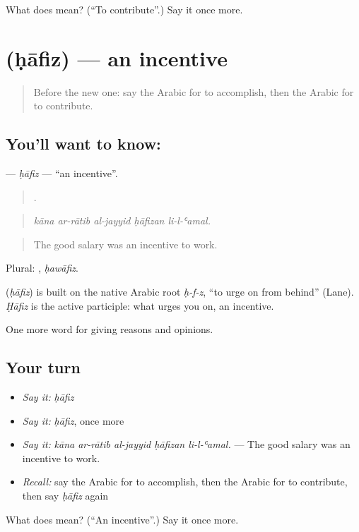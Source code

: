 \begin{tcolorbox}[breakable,colback=teal!4,colframe=teal!35!black,title={Before you move on}]
What does  mean? (\textquotedblleft{}To contribute\textquotedblright{}.) Say it once more.
\end{tcolorbox}
\section[\texorpdfstring{\ar{حافز} (ḥāfiz)}{حافز (ḥāfiz)}]{ (ḥāfiz) — an incentive}

\label{lesson:AR-C371-hafiz}



\begin{quote}
Before the new one: say the Arabic for to accomplish, then the Arabic for to contribute.
\end{quote}

\subsection*{You'll want to know: }
\textbf{} — \emph{ḥāfiz} — \textquotedblleft{}an incentive\textquotedblright{}.

\begin{quote}
    .
\end{quote}

\begin{quote}
\emph{kāna ar-rātib al-jayyid ḥāfizan li-l-ʿamal.}
\end{quote}

\begin{quote}
The good salary was an incentive to work.
\end{quote}

Plural: , \emph{ḥawāfiz}.

\begin{cousinweb}
\textbf{} (\emph{ḥāfiz}) is built on the native Arabic root \emph{ḥ-f-z}, \textquotedblleft{}to urge on from behind\textquotedblright{} (Lane). \emph{Ḥāfiz} is the active participle: what urges you on, an incentive.
\end{cousinweb}

\begin{grammarlens}[title={What you've built}]
One more word for giving reasons and opinions.
\end{grammarlens}

\subsection*{Your turn}
\begin{itemize}
\raggedright
  \item \emph{Say it:} \emph{ḥāfiz}
  \item \emph{Say it:} \emph{ḥāfiz}, once more
  \item \emph{Say it:} \emph{kāna ar-rātib al-jayyid ḥāfizan li-l-ʿamal.} — The good salary was an incentive to work.
  \item \emph{Recall:} say the Arabic for to accomplish, then the Arabic for to contribute, then say \emph{ḥāfiz} again
\end{itemize}

\begin{tcolorbox}[breakable,colback=teal!4,colframe=teal!35!black,title={Before you move on}]
What does  mean? (\textquotedblleft{}An incentive\textquotedblright{}.) Say it once more.
\end{tcolorbox}
